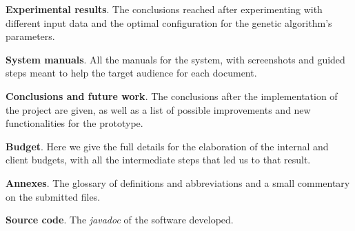 \begin{description}
    \item \textbf{Experimental results}. The conclusions reached after experimenting with different input data and the optimal configuration for the genetic algorithm's parameters. 

    \item \textbf{System manuals}. All the manuals for the system, with screenshots and guided steps meant to help the target audience for each document. 

    \item \textbf{Conclusions and future work}. The conclusions after the implementation of the project are given, as well as a list of possible improvements and new functionalities for the prototype. 

    \item \textbf{Budget}. Here we give the full details for the elaboration of the internal and client budgets, with all the intermediate steps that led us to that result. 

    \item \textbf{Annexes}. The glossary of definitions and abbreviations and a small commentary on the submitted files.

    \item \textbf{Source code}. The \textit{javadoc} of the software developed. 

\end{description}

